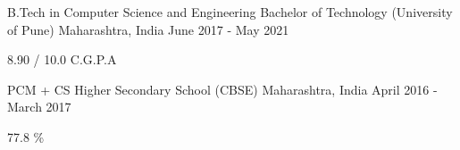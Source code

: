 


\begin{cventries}

  \cventry
    {B.Tech in Computer Science and Engineering} %
    {Bachelor of Technology (University of Pune)} %
    {Maharashtra, India} %
    {June 2017 - May 2021} %
    {
      \begin{cvitems} %
        \item {8.90 / 10.0 C.G.P.A}
      \end{cvitems}
    }

\end{cventries}

\begin{cventries}

  \cventry
    {PCM + CS} %
    {Higher Secondary School (CBSE)} %
    {Maharashtra, India} %
    {April 2016 - March 2017} %
    {
      \begin{cvitems} %
        \item {77.8 \%}
      \end{cvitems}
    }

\end{cventries}